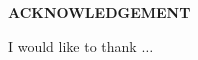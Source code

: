 \begin{center}
	{\textbf{\Large{ACKNOWLEDGEMENT}}}
\end{center}

I would like to thank $\ldots$
\vspace{6em}

\hfill\textbf{\mystudentname}
